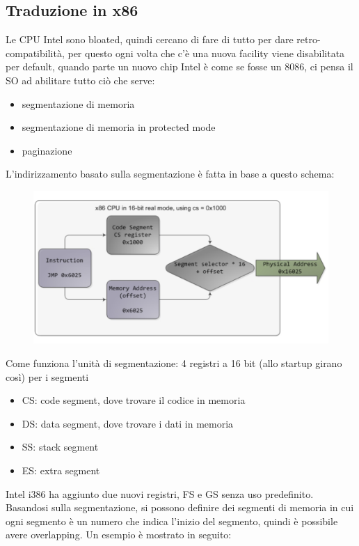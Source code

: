 \documentclass[12pt, oneside]{extbook} %
\begin{document}
\subsection{Traduzione in x86}
Le CPU Intel sono bloated, quindi cercano di fare di tutto per dare retro-compatibilità, per questo ogni volta che c'è una nuova facility viene disabilitata per default, quando parte un nuovo chip Intel è come se fosse un 8086, ci pensa il SO ad abilitare tutto ciò che serve:
\begin{itemize}
\item segmentazione di memoria
\item segmentazione di memoria in protected mode
\item paginazione
\end{itemize}
L'indirizzamento basato sulla segmentazione è fatta in base a questo schema:
\begin{figure}[!h]
	\includegraphics[scale=0.3]{immagini/seg_based_transl.png}
\end{figure}
Come funziona l'unità di segmentazione: 4 registri a 16 bit (allo startup girano così) per i segmenti
\begin{itemize}
\item CS: code segment, dove trovare il codice in memoria
\item DS: data segment, dove trovare i dati in memoria
\item SS: stack segment
\item ES: extra segment
\end{itemize}
Intel i386 ha aggiunto due nuovi registri, FS e GS senza uso predefinito.\\ Basandosi sulla segmentazione, si possono definire dei segmenti di memoria in cui ogni segmento è un numero che indica l'inizio del segmento, quindi è possibile avere overlapping. Un esempio è mostrato in seguito:
\end{document}
